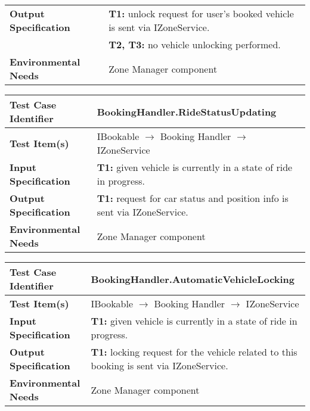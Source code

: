 {\begin{tabularx}{\textwidth}{l X}
    \textbf{Output Specification} & \textbf{T1:} unlock request for user's booked vehicle is sent via IZoneService.  \\
                                & \textbf{T2, T3:} no vehicle unlocking performed.\\
    \hline 
    
    \textbf{Environmental Needs} & Zone Manager component\\
    \hline
\end{tabularx}
\bigskip 

\noindent
\begin{tabularx}{\textwidth}{l X}
    \hline 
    \textbf{Test Case Identifier} & BookingHandler.RideStatusUpdating\\ 
    \hline 
    
    \textbf{Test Item(s)} & IBookable $\rightarrow$ Booking Handler $\rightarrow$ IZoneService\\
    \hline 
    
    \textbf{Input Specification} & \textbf{T1:} given vehicle is currently in a state of ride in progress.\\
    \hline 
    
    \textbf{Output Specification} & \textbf{T1:} request for car status and position info is sent via IZoneService.\\
    \hline 
    
    \textbf{Environmental Needs} & Zone Manager component\\
    \hline
\end{tabularx}
\bigskip 

\noindent
\begin{tabularx}{\textwidth}{l X}
    \hline 
    \textbf{Test Case Identifier} & BookingHandler.AutomaticVehicleLocking\\ 
    \hline 
    
    \textbf{Test Item(s)} & IBookable $\rightarrow$ Booking Handler $\rightarrow$ IZoneService\\
    \hline 
    
    \textbf{Input Specification} & \textbf{T1:} given vehicle is currently in a state of ride in progress.\\
    \hline 
    
    \textbf{Output Specification} & \textbf{T1:} locking request for the vehicle related to this booking is sent via IZoneService.\\
    \hline 
    
    \textbf{Environmental Needs} & Zone Manager component\\
    \hline
\end{tabularx}




}
